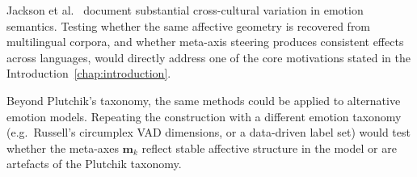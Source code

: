 Jackson et al.~\cite{jackson2019emotion} document substantial cross-cultural variation in emotion semantics. Testing whether the same affective geometry is recovered from multilingual corpora, and whether meta-axis steering produces consistent effects across languages, would directly address one of the core motivations stated in the Introduction~\ref{chap:introduction}.\par

Beyond Plutchik's taxonomy, the same methods could be applied to alternative emotion models. Repeating the construction with a different emotion taxonomy (e.g.\ Russell's circumplex VAD dimensions, or a data-driven label set) would test whether the meta-axes $\mathbf{m}_k$ reflect stable affective structure in the model or are artefacts of the Plutchik taxonomy.\par
